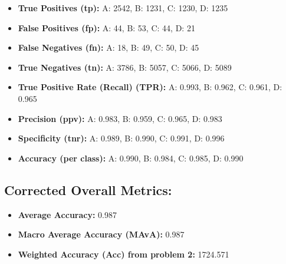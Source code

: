 \documentclass{article}
\begin{document}
\begin{itemize}
    \item \textbf{True Positives (tp):} A: 2542, B: 1231, C: 1230, D: 1235
    \item \textbf{False Positives (fp):} A: 44, B: 53, C: 44, D: 21
    \item \textbf{False Negatives (fn):} A: 18, B: 49, C: 50, D: 45
    \item \textbf{True Negatives (tn):} A: 3786, B: 5057, C: 5066, D: 5089
    \item \textbf{True Positive Rate (Recall) (TPR):} A: 0.993, B: 0.962, C: 0.961, D: 0.965
    \item \textbf{Precision (ppv):} A: 0.983, B: 0.959, C: 0.965, D: 0.983
    \item \textbf{Specificity (tnr):} A: 0.989, B: 0.990, C: 0.991, D: 0.996
    \item \textbf{Accuracy (per class):} A: 0.990, B: 0.984, C: 0.985, D: 0.990
\end{itemize}

\subsection*{Corrected Overall Metrics:}

\begin{itemize}
    \item \textbf{Average Accuracy:} 0.987
    \item \textbf{Macro Average Accuracy (MAvA):} 0.987
    \item \textbf{Weighted Accuracy (Acc) from problem 2:} 1724.571
\end{itemize}
\end{document}
